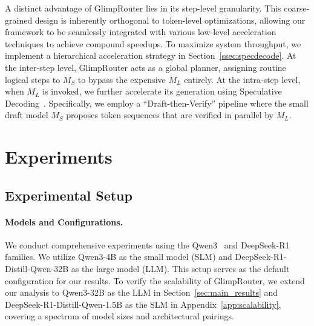 \documentclass[11pt]{article}
\newcommand{\todoc}[2]{{\textcolor{#1}{{[#2]}}}}
\newcommand{\todoviolet}[1]{\todoc{violet}{\textbf{#1}}}
\newcommand{\zeng}[1]{\textcolor[rgb]{1,0.66,0}{\textbf{[Zeng: #1]}}}
\newcommand{\shi}[1]{\todoviolet{Shi: #1}}
\newcommand{\approach}{{GlimpRouter}\xspace}
\begin{document}

A distinct advantage of \approach lies in its step-level granularity. This coarse-grained design is inherently orthogonal to token-level optimizations, allowing our framework to be seamlessly integrated with various low-level acceleration techniques to achieve compound speedups. To maximize system throughput, we implement a hierarchical acceleration strategy in Section~\ref{ssec:specdecode}.
At the inter-step level, \approach acts as a global planner, assigning routine logical steps to $M_S$ to bypass the expensive $M_L$ entirely.
At the intra-step level, when $M_L$ is invoked, we further accelerate its generation using Speculative Decoding~\cite{leviathan2023fast}. Specifically, we employ a ``Draft-then-Verify'' pipeline where the small draft model $M_S$ proposes token sequences that are verified in parallel by $M_L$.









\section{Experiments}
\label{sec:experiments}

\subsection{Experimental Setup}
\label{ssec:setup}

\paragraph{Models and Configurations.}
We conduct comprehensive experiments using the Qwen3~\cite{yang2025qwen3} and DeepSeek-R1~\cite{guo2025deepseek} families.
We utilize Qwen3-4B as the small model (SLM) and DeepSeek-R1-Distill-Qwen-32B as the large model (LLM). This setup serves as the default configuration for our results.
To verify the scalability of \approach, we extend our analysis to Qwen3-32B as the LLM in Section~\ref{sec:main_results} and DeepSeek-R1-Distill-Qwen-1.5B as the SLM in Appendix~\ref{app:scalability}, covering a spectrum of model sizes and architectural pairings.
\end{document}
